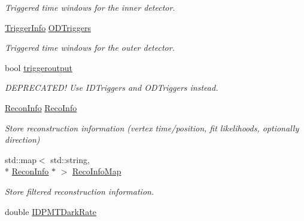 \begin{DoxyCompactItemize}
\begin{DoxyCompactList}\small\item\em Triggered time windows for the inner detector. \end{DoxyCompactList}\item 
\hypertarget{classDataModel_aac80402a18f6fcde9ec271211152e3a0}{\hyperlink{classTriggerInfo}{Trigger\-Info} \hyperlink{classDataModel_aac80402a18f6fcde9ec271211152e3a0}{O\-D\-Triggers}}\label{classDataModel_aac80402a18f6fcde9ec271211152e3a0}

\begin{DoxyCompactList}\small\item\em Triggered time windows for the outer detector. \end{DoxyCompactList}\item 
\hypertarget{classDataModel_a5471c8c372e061f47601f7c910e5d5c1}{bool \hyperlink{classDataModel_a5471c8c372e061f47601f7c910e5d5c1}{triggeroutput}}\label{classDataModel_a5471c8c372e061f47601f7c910e5d5c1}

\begin{DoxyCompactList}\small\item\em D\-E\-P\-R\-E\-C\-A\-T\-E\-D! Use I\-D\-Triggers and O\-D\-Triggers instead. \end{DoxyCompactList}\item 
\hypertarget{classDataModel_a3fa7b34f677cf748f48ac8e1ab43eddd}{\hyperlink{classReconInfo}{Recon\-Info} \hyperlink{classDataModel_a3fa7b34f677cf748f48ac8e1ab43eddd}{Reco\-Info}}\label{classDataModel_a3fa7b34f677cf748f48ac8e1ab43eddd}

\begin{DoxyCompactList}\small\item\em Store reconstruction information (vertex time/position, fit likelihoods, optionally direction) \end{DoxyCompactList}\item 
\hypertarget{classDataModel_a251e064bd60670ee4ac0eb94e42706ba}{std\-::map$<$ std\-::string, \\*
\hyperlink{classReconInfo}{Recon\-Info} $\ast$ $>$ \hyperlink{classDataModel_a251e064bd60670ee4ac0eb94e42706ba}{Reco\-Info\-Map}}\label{classDataModel_a251e064bd60670ee4ac0eb94e42706ba}

\begin{DoxyCompactList}\small\item\em Store filtered reconstruction information. \end{DoxyCompactList}\item 
\hypertarget{classDataModel_a402d65b5d38d1df743b148ff2050f30f}{double \hyperlink{classDataModel_a402d65b5d38d1df743b148ff2050f30f}{I\-D\-P\-M\-T\-Dark\-Rate}}\label{classDataModel_a402d65b5d38d1df743b148ff2050f30f}


\end{DoxyCompactItemize}
